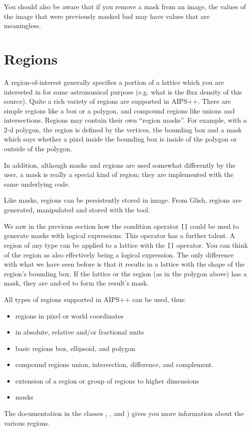 \medskip\noindent You should also be aware that if you remove a mask from an image,
the values of the image that were previously masked bad 
may have values that are meaningless.


\section{\label{LEL:REGIONS}Regions}

A region-of-interest generally specifies a portion of a lattice which you
are interested in for some astronomical purpose (e.g.  what is the flux
density of this source).  Quite a rich variety of regions are supported
in AIPS++.  There are simple regions like a box or a polygon, and
compound regions like unions and intersections.  Regions may contain
their own ``region masks''.  For example, with a 2-d polygon, the region is defined
by the vertices, the bounding box and a mask which says whether a pixel
inside the bounding box is inside of the polygon or outside of the
polygon. 

\medskip\noindent In addition, although masks and regions are used somewhat differently by
the user, a mask is really a special kind of region; they are implemented
with the same underlying code.

\medskip\noindent Like masks, regions can be persistently stored in image.  From Glish,
regions are generated, manipulated and stored with the
 tool.

\medskip\noindent We saw in the previous section how the condition operator {\tt []} could
be used to generate masks with logical expressions.  This operator has a
further talent.  A region of any type can be applied to a lattice with
the {\tt []} operator.  You can think of the region as also effectively
being a logical expression.  The only difference with what we have seen
before is that it results in a lattice with the shape of the region's
bounding box.  If the lattice or the region (as in the polygon above)
has a mask, they are and-ed to form the result's mask. 

\medskip\noindent All types of regions supported in AIPS++ can be used, thus:

\begin{itemize}
\item regions in pixel or world coordinates
\item in absolute, relative and/or fractional units
\item basic regions box, ellipsoid, and polygon
\item compound regions union, intersection, difference, and complement.
\item extension of a region or group of regions to higher dimensions
\item masks
\end{itemize}
The documentation in the classes
 ,
 , and
 )
gives you more information about the various regions.

